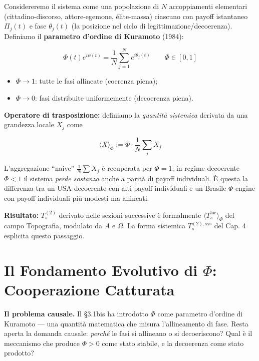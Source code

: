 \Hypoth{} Considereremo il sistema come una popolazione di \(N\)
accoppiamenti elementari (cittadino-discorso, attore-egemone,
élite-massa) ciascuno con payoff istantaneo \(\Pi_j(t)\) e fase
\(\theta_j(t)\) (la posizione nel ciclo di legittimazione/decoerenza).
Definiamo il \textbf{parametro d'ordine di Kuramoto} (1984):

\[
\Phi(t) e^{i\psi(t)} = \frac{1}{N}\sum_{j=1}^{N} e^{i\theta_j(t)} \qquad \Phi \in [0, 1]
\]

\begin{itemize}
\tightlist
\item
  \(\Phi \to 1\): tutte le fasi allineate (coerenza piena);
\item
  \(\Phi \to 0\): fasi distribuite uniformemente (decoerenza piena).
\end{itemize}

\Hypoth{} \textbf{Operatore di trasposizione:} definiamo la
\emph{quantità sistemica} derivata da una grandezza locale \(X_j\) come

\[
\langle X \rangle_\Phi := \Phi \cdot \frac{1}{N}\sum_j X_j
\]

L'aggregazione ``naive'' \(\frac{1}{N}\sum X_j\) è recuperata per
\(\Phi = 1\); in regime decoerente \(\Phi < 1\) il sistema \emph{perde
sostanza} anche a parità di payoff individuali. È questa la differenza
tra un USA decoerente con alti payoff individuali e un Brasile
\(\Phi\)-engine con payoff individuali più modesti ma allineati.

\Proved{} \textbf{Risultato:} \(T_s^{(2)}\) derivato nelle sezioni
successive è formalmente \(\langle T_s^{\text{loc}}\rangle_\Phi\) del
campo Topografia, modulato da \(A\) e \(\Omega\). La forma sistemica
\(T_s^{(2),\text{sys}}\) del Cap. 4 esplicita questo passaggio.



\section{\texorpdfstring{Il Fondamento Evolutivo di \(\Phi\): Cooperazione
Catturata}{Il Fondamento Evolutivo di Phi: Cooperazione Catturata}}\label{il-fondamento-evolutivo-di-phi}

\Hypoth{} \textbf{Il problema causale.} Il \S{}3.1bis ha introdotto
\(\Phi\) come parametro d'ordine di Kuramoto --- una quantità matematica
che misura l'allineamento di fase. Resta aperta la domanda causale:
\emph{perché} le fasi si allineano o si decoeriscono? Qual è il
meccanismo che produce \(\Phi > 0\) come stato stabile, e la decoerenza
come stato prodotto?

